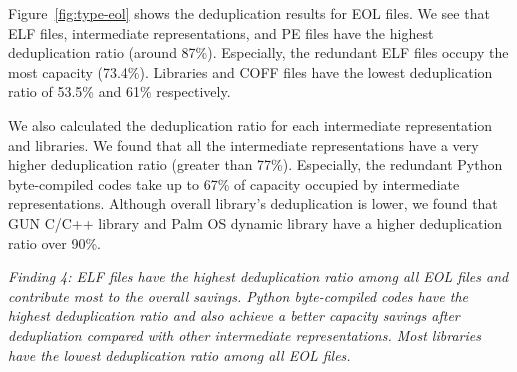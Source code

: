 Figure~\ref{fig:type-eol} shows the deduplication results for EOL files.
We see that ELF files, intermediate representations, and PE files have the highest deduplication ratio (around 87\%). Especially, the redundant ELF files occupy the most capacity (73.4\%). 
Libraries and COFF files have the lowest deduplication ratio of 53.5\% and 61\% respectively.

We also calculated the deduplication ratio for each intermediate representation and libraries. We found that all the intermediate representations have a very higher deduplication ratio (greater than 77\%). Especially, the redundant Python byte-compiled codes take up to 67\% of capacity occupied by intermediate representations. Although overall library's deduplication is lower, we found that GUN C/C++ library and Palm OS dynamic library have a higher deduplication ratio over 90\%.

\textit{Finding 4: ELF files have the highest deduplication ratio among all EOL files and contribute most to the overall savings. Python byte-compiled codes have the highest deduplication ratio and also achieve a better capacity savings after dedupliation compared with other intermediate representations. Most libraries have the lowest deduplication ratio among all EOL files.}

%


